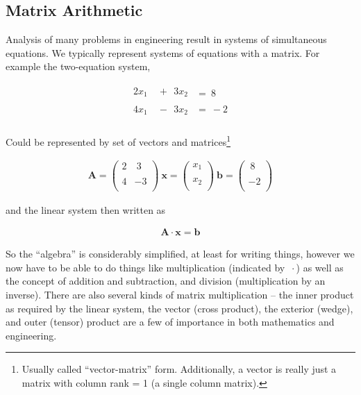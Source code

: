  
\subsection{Matrix Arithmetic}
Analysis of many problems in engineering result in systems of simultaneous equations.  
We typically represent systems of equations with a matrix.  
For example the two-equation system,

\begin{gather}
\begin{matrix}
2x_1 & ~+~~3x_2  \\
~\\
4x_1 & ~-~~3x_2 \\
\end{matrix}
\begin{matrix}
=~8\\
~\\
=~-2\\
\end{matrix}
\end{gather}

Could be represented by set of vectors and matrices\footnote{Usually called ``vector-matrix'' form.   Additionally, a vector is really just a matrix with column rank = 1 (a single column matrix).}

\begin{gather}
\mathbf{A} =
\begin{pmatrix}
2 & ~3 \\
~\\
4 & -3 \\
\end{pmatrix}
~
\mathbf{x} =
\begin{pmatrix}
x_1\\
~\\
x_2\\
\end{pmatrix}
~
\mathbf{b} =
\begin{pmatrix}
~8\\
~\\
-2\\
\end{pmatrix}
\end{gather}

and the linear system then written as

\begin{gather}
\mathbf{A} \cdot \mathbf{x} = \mathbf{b}
\end{gather}

So the ``algebra'' is considerably simplified, at least for writing things, 
however we now have to be able to do things like multiplication (indicated by $ ~\cdot $) as well as the concept of addition and subtraction, and division (multiplication by an inverse).  
There are also several kinds of matrix multiplication -- the inner product as required by the linear system, the vector (cross product), the exterior (wedge), and outer (tensor) product are a few of importance in both mathematics and engineering. 

